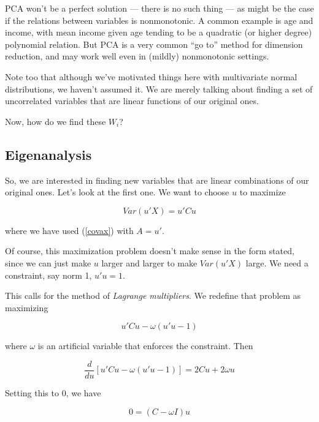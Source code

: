 PCA won't be a perfect solution --- there is no such thing --- as might
be the case if the relations between variables is nonmonotonic.  A
common example is age and income, with mean income given age tending to be a
quadratic (or higher degree) polynomial relation.  But PCA is a very
common ``go to'' method for dimension reduction, and may work well even
in (mildly) nonmonotonic settings.

Note too that although we've motivated things here with multivariate
normal distributions, we haven't assumed it.  We are merely talking
about finding a set of uncorrelated variables that are linear functions
of our original ones.

Now, how do we find these $W_i$?


\subsection{Eigenanalysis}

So, we are interested in finding new variables that are linear
combinations of our original ones.  Let's look at the first one.  
We want to choose $u$ to maximize 

\begin{equation}
Var(u'X) = u' C u
\end{equation}

where we have used (\ref{covax}) with $A = u'$.

Of course, this maximization problem doesn't make sense in the form
stated, since we can just make $u$ larger and larger to make $Var(u'X)$
large.  We need a constraint, say norm 1, $u'u = 1$.   

This calls for the method of \textit{Lagrange multipliers}.  We redefine
that problem as maximizing 

\begin{equation}
u'Cu - \omega (u'u - 1)
\end{equation}

where $\omega$ is an artificial variable that enforces the constraint.
Then

\begin{equation}
\frac{d}{du} [u'Cu - \omega (u'u - 1)] = 2 Cu + 2 \omega u 
\end{equation}

Setting this to 0, we have

\begin{equation}
0 = (C - \omega I) u
\end{equation}

